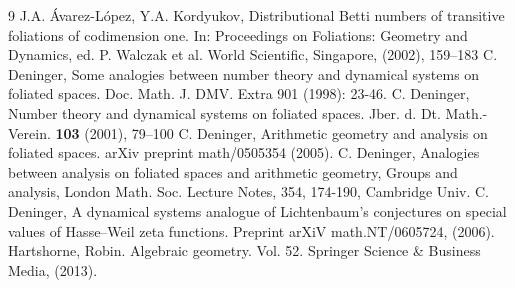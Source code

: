 \begin{thebibliography}{9}
 J.A. \'Avarez-L\'opez, Y.A. Kordyukov, Distributional Betti numbers of transitive foliations of codimension one. In: Proceedings on Foliations: Geometry and Dynamics, ed. P. Walczak et al. World Scientific, Singapore, (2002), 159--183
 C. Deninger, Some analogies between number theory and dynamical systems on foliated spaces. Doc. Math. J. DMV. Extra 901 (1998): 23-46.
 C. Deninger, Number theory and dynamical systems on foliated spaces. Jber. d. Dt. Math.-Verein. {\bf 103} (2001), 79--100
 C. Deninger, Arithmetic geometry and analysis on foliated spaces. arXiv preprint math/0505354 (2005).
 C. Deninger, Analogies between analysis on foliated spaces and arithmetic geometry, Groups and analysis, London Math. Soc. Lecture Notes, 354, 174-190, Cambridge Univ.
 C. Deninger, A dynamical systems analogue of Lichtenbaum's conjectures on special values of Hasse--Weil zeta functions. Preprint arXiV math.NT/0605724, (2006).
 Hartshorne, Robin. Algebraic geometry. Vol. 52. Springer Science \& Business Media, (2013).
\end{thebibliography}